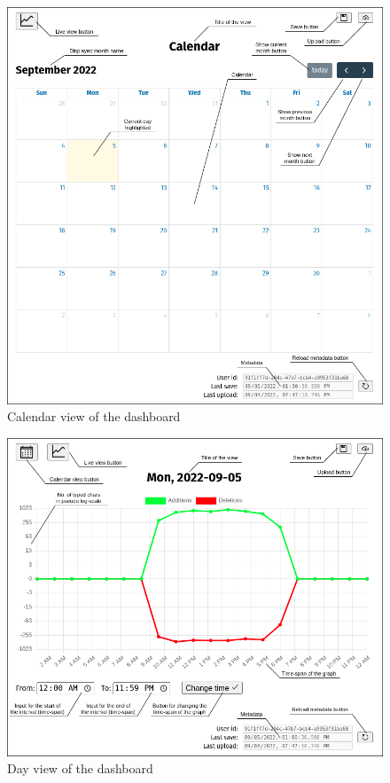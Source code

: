 \begin{figure}[htbp]
  \centering
  \includegraphics[scale=0.4]{chapters/methodology/graphics/calendar-view.png}
  \caption{Calendar view of the dashboard}
  \label{fig:calendar_view}
\end{figure}

\begin{figure}[htbp]
  \centering
  \includegraphics[scale=0.4]{chapters/methodology/graphics/day-view.png}
  \caption{Day view of the dashboard}
  \label{fig:day_view}
\end{figure}
